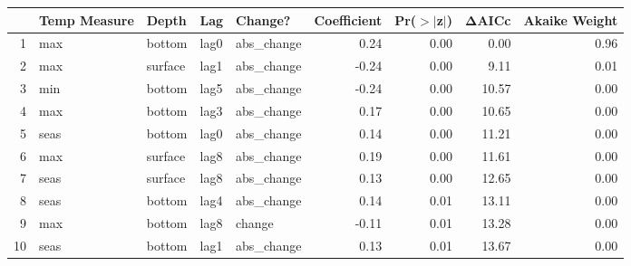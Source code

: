 % 
\begin{tabular}{rllllrrrr}
  \hline
 & Temp Measure & Depth & Lag & Change? & Coefficient & Pr($>$$|$z$|$) & ΔAICc & Akaike Weight \\ 
  \hline
1 & max & bottom & lag0 & abs\_change & 0.24 & 0.00 & 0.00 & 0.96 \\ 
  2 & max & surface & lag1 & abs\_change & -0.24 & 0.00 & 9.11 & 0.01 \\ 
  3 & min & bottom & lag5 & abs\_change & -0.24 & 0.00 & 10.57 & 0.00 \\ 
  4 & max & bottom & lag3 & abs\_change & 0.17 & 0.00 & 10.65 & 0.00 \\ 
  5 & seas & bottom & lag0 & abs\_change & 0.14 & 0.00 & 11.21 & 0.00 \\ 
  6 & max & surface & lag8 & abs\_change & 0.19 & 0.00 & 11.61 & 0.00 \\ 
  7 & seas & surface & lag8 & abs\_change & 0.13 & 0.00 & 12.65 & 0.00 \\ 
  8 & seas & bottom & lag4 & abs\_change & 0.14 & 0.01 & 13.11 & 0.00 \\ 
  9 & max & bottom & lag8 & change & -0.11 & 0.01 & 13.28 & 0.00 \\ 
  10 & seas & bottom & lag1 & abs\_change & 0.13 & 0.01 & 13.67 & 0.00 \\ 
   \hline
\end{tabular}
